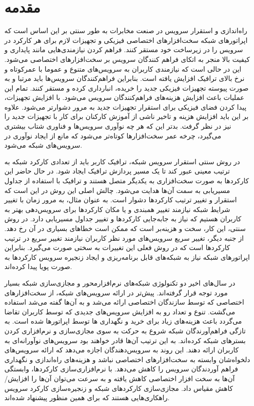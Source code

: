\chapter{مقدمه}

راه‌اندازی و استقرار سرویس در صنعت مخابرات به طور سنتی بر این اساس است که اپراتورهای شبکه سخت‌افزارهای اختصاصی فیزیکی و تجهیزات لازم برای هر کارکرد در سرویس را در زیرساخت خود مستقر کنند.
فراهم کردن نیازمندی‌هایی مانند پایداری و کیفیت بالا منجر به اتکای فراهم کنندگان سرویس بر سخت‌افزارهای اختصاصی می‌شود. 
این در حالی است که نیازمندی کاربران به سرویس‌های متنوع و عموما با عمرکوتاه و نرخ بالای ترافیک افزایش یافته است.
بنابراین فرا‌هم‌کنندگان سرویس‌ها باید مرتبا و به صورت پیوسته تجهیزات فیزیکی جدید را خریده، انبارداری کرده و مستقر کنند.
تمام این عملیات باعث افزایش هزینه‌های فراهم‌کنندگان سرویس می‌شود.
با افزایش تجهیزات، پیدا کردن فضای فیزیکی برای استقرار تجهیزات جدید به مرور دشوارتر می‌شود.
علاوه بر این باید افزایش هزینه و تاخیر ناشی از آموزش کارکنان برای کار با تجهیزات جدید را نیز در نظر گرفت.
بدتر این که هر چه نوآوری سرویس‌ها و فناوری شتاب بیشتری می‌گیرد، چرخه عمر سخت‌افزارها کوتاه‌تر می‌شود که مانع از ایجاد نوآوری در سرویس‌های شبکه می‌شود.

در روش سنتی استقرار سرویس شبکه، ترافیک کاربر باید از تعدادی کارکرد شبکه به ترتیب معینی عبور کند تا یک مسیر پردازش ترافیک ایجاد شود.
در حال حاضر این کارکردها به صورت سخت‌افزاری به یکدیگر متصل هستند و ترافیک با استفاده از جداول مسیریابی به سمت آن‌ها هدایت می‌شود.
چالش اصلی این روش در این است که استقرار و تغییر ترتیب کارکردها دشوار است.
به عنوان مثال، به مرور زمان با تغییر شرایط شبکه نیازمند تغییر همبندی و یا مکان کارکردها برای سرویس‌دهی بهتر به کاربران هستیم که نیاز به جا‌به‌جایی کارکردها و تغییر جداول مسیریابی دارد.
در روش سنتی، این کار، سخت و هزینه‌بر است که ممکن است خطاهای بسیاری در آن رخ دهد.
از جنبه دیگر، تغییر سریع سرویس‌های مورد نظر کاربران نیازمند تغییر سریع در ترتیب کارکردها است که در روش فعلی این تغییرات به سختی صورت می‌گیرد.
بنابراین اپراتورهای شبکه نیاز به شبکه‌های قابل برنامه‌ریزی و ایجاد زنجیره سرویس کارکردها به صورت پویا پیدا کرده‌اند.

در سال‌های اخیر دو تکنولوژی شبکه‌های نرم‌افزارمحور و مجازی‌سازی شبکه بسیار مورد توجه قرار گرفته‌اند.
پیش‌تر در ارائه سرویس‌های شبکه، از سخت‌افزارهای اختصاصی که توسط سازندگان اختصاصی ارائه می‌شد و به آن‌ها
گفته می‌شد استفاده می‌گشت.
تنوع و تعداد رو به افزایش سرویس‌های جدیدی که توسط کاربران تقاضا می‌گردد
باعث هزینه‌های زیاد برای خرید و نگهداری
‌ها
توسط اپراتورها شده است.
به تازگی فراهم‌آورندگان شبکه
شروع به حرکت به سوی مجازی‌سازی و نرم‌افزاری کردن بسترهای شبکه کرده‌اند.
به این ترتیب آن‌ها قادر خواهند بود
سرویس‌های نوآورانه‌ای به کاربران ارائه دهند.
این روند به سرویس‌دهندگان اجازه می‌دهد که ارائه سرویس‌های دلخواه‌شان وابسته به سخت‌افزارهای اختصاصی نباشد و 
هزینه‌های راه‌اندازی و نگهداری فراهم آوردندگان سرویس را کاهش می‌دهد.
با نرم‌افزاری‌سازی کارکردها، وابستگی آن‌ها به سخت افزار اختصاصی کاهش یافته و به سرعت می‌توان آن‌ها را افزایش/کاهش مقیاس داد.
مجازی‌سازی کارکردهای شبکه و زنجیره‌سازی کارکرد سرویس‌ راهکاری‌هایی هستند که برای همین منظور پیشنهاد شده‌اند.

